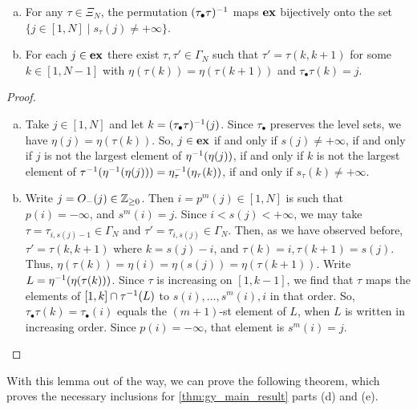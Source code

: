 \begin{lemma}\label{lem:tau_bullet_ex_gamma}
	\leavevmode
	\begin{enumerate}[(a)]
		\item For any $\tau \in \Xi_N$, the permutation $(\tau_\bullet\tau)^{-1}$ maps $\mathbf{ex}$
		      bijectively onto the set $\{j \in [1, N] \mid s_\tau(j) \neq + \infty\}$.
		\item For each $j \in \mathbf{ex}$ there exist $\tau, \tau'\in \Gamma_N$ such that $\tau' = \tau(k,
			      k+1)$ for some $k \in [1, N-1]$ with $\eta(\tau(k)) = \eta(\tau(k+1))$ and
		      $\tau_\bullet\tau(k) = j$.
	\end{enumerate}
\end{lemma}
\begin{proof}
	\begin{enumerate}[(a)]
		\item Take $j\in [1, N]$ and let $k = (\tau_\bullet \tau)^{-1}(j)$. Since $\tau_\bullet$
		      preserves the level sets, we have $\eta(j) = \eta(\tau(k))$. So, $j \in \mathbf{ex}$ if and
		      only if $s(j) \neq + \infty$, if and only if $j$ is not the largest element of
		      $\eta^{-1}(\eta(j))$, if and only if $k$ is not the largest element of
		      $\tau^{-1}(\eta^{-1}(\eta(j))) = \eta_\tau^{-1}(\eta_\tau(k))$, if and only if $s_\tau(k)
			      \neq + \infty$.
		\item Write $j = O_{-}(j) \in \mathbb{Z}_{\geq 0}$. Then $i = p^m(j) \in [1, N]$ is such that $p(i)
			      = -\infty$, and $s^m(i) = j$. Since $i < s(j) < + \infty$, we may take $\tau = \tau_{i,
				      s(j) - 1}\in \Gamma_N$ and $\tau' = \tau_{i, s(j)} \in \Gamma_N$. Then, as we have
		      observed before, $\tau' = \tau(k, k+1)$ where $k = s(j) - i$, and $\tau(k) = i,
			      \tau(k+1) = s(j)$. Thus, $\eta(\tau(k)) = \eta(i) = \eta(s(j)) = \eta(\tau(k+1))$.
		      Write $L = \eta^{-1}(\eta(\tau(k)))$. Since $\tau$ is increasing on $[1, k - 1]$, we
		      find that $\tau$ maps the elements of $[1, k] \cap \tau^{-1}(L)$ to $s(i), \dots,
			      s^m(i), i$ in that order. So, $\tau_\bullet\tau(k) = \tau_\bullet(i)$ equals the
		      $(m+1)$-st element of $L$, when $L$ is written in increasing order. Since $p(i) =
			      -\infty$, that element is $s^m(i) = j$.
	\end{enumerate}
\end{proof}

With this lemma out of the way, we can prove the following theorem, which proves the
necessary inclusions for \cref{thm:gy_main_result} parts (d) and (e).

